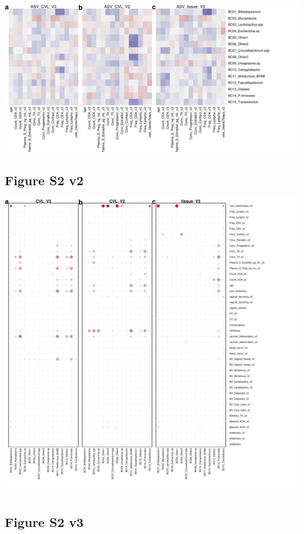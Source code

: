 \documentclass[
]{article}
\begin{document}
\includegraphics[width=1\linewidth]{manuscript_template_files/figure-latex/unnamed-chunk-10-1}

\clearpage

\hypertarget{figure-s2-v2}{%
\subsection{Figure S2 v2}\label{figure-s2-v2}}

\includegraphics[width=1\linewidth]{manuscript_template_files/figure-latex/unnamed-chunk-11-1}

\clearpage

\hypertarget{figure-s2-v3}{%
\subsection{Figure S2 v3}\label{figure-s2-v3}}
\end{document}
